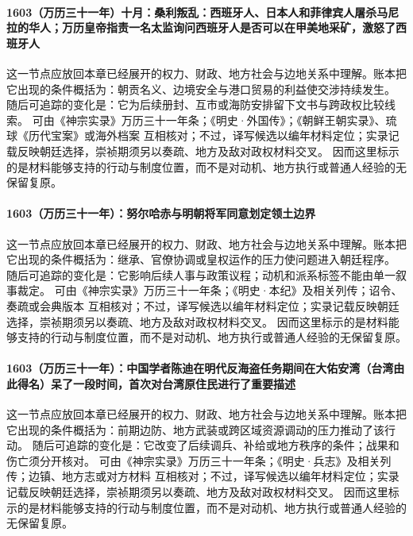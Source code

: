 \paragraph{1603（万历三十一年）十月：桑利叛乱：西班牙人、日本人和菲律宾人屠杀马尼拉的华人；万历皇帝指责一名太监询问西班牙人是否可以在甲美地采矿，激怒了西班牙人} 这一节点应放回本章已经展开的权力、财政、地方社会与边地关系中理解。账本把它出现的条件概括为：朝贡名义、边境安全与港口贸易的利益使交涉持续发生。 随后可追踪的变化是：它为后续册封、互市或海防安排留下文书与跨政权比较线索。 可由《神宗实录》万历三十一年条；《明史·外国传》；《朝鲜王朝实录》、琉球《历代宝案》或海外档案 互相核对；不过，译写候选以编年材料定位；实录记载反映朝廷选择，崇祯期须另以奏疏、地方及敌对政权材料交叉。 因而这里标示的是材料能够支持的行动与制度位置，而不是对动机、地方执行或普通人经验的无保留复原。

\paragraph{1603（万历三十一年）：努尔哈赤与明朝将军同意划定领土边界} 这一节点应放回本章已经展开的权力、财政、地方社会与边地关系中理解。账本把它出现的条件概括为：继承、官僚协调或皇权运作的压力使问题进入朝廷程序。 随后可追踪的变化是：它影响后续人事与政策议程；动机和派系标签不能由单一叙事裁定。 可由《神宗实录》万历三十一年条；《明史·本纪》及相关列传；诏令、奏疏或会典版本 互相核对；不过，译写候选以编年材料定位；实录记载反映朝廷选择，崇祯期须另以奏疏、地方及敌对政权材料交叉。 因而这里标示的是材料能够支持的行动与制度位置，而不是对动机、地方执行或普通人经验的无保留复原。

\paragraph{1603（万历三十一年）：中国学者陈迪在明代反海盗任务期间在大佑安湾（台湾由此得名）呆了一段时间，首次对台湾原住民进行了重要描述} 这一节点应放回本章已经展开的权力、财政、地方社会与边地关系中理解。账本把它出现的条件概括为：前期边防、地方武装或跨区域资源调动的压力推动了该行动。 随后可追踪的变化是：它改变了后续调兵、补给或地方秩序的条件；战果和伤亡须分开核对。 可由《神宗实录》万历三十一年条；《明史·兵志》及相关列传；边镇、地方志或对方材料 互相核对；不过，译写候选以编年材料定位；实录记载反映朝廷选择，崇祯期须另以奏疏、地方及敌对政权材料交叉。 因而这里标示的是材料能够支持的行动与制度位置，而不是对动机、地方执行或普通人经验的无保留复原。


